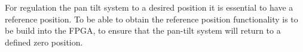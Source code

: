 \documentclass[../../main.tex]{subfiles}
\begin{document}
For regulation the pan tilt system to a desired position it is essential to have a reference position. To be able to obtain the reference position functionality is to be build into the FPGA, to ensure that the pan-tilt system will return to a defined zero position. 
\end{document}
